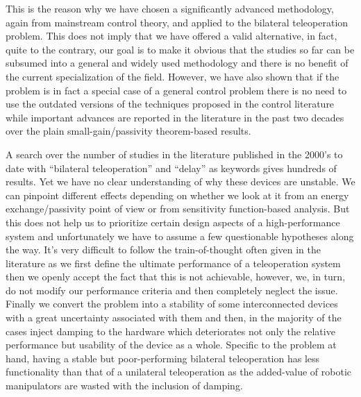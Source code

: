 This is the reason why we have chosen a significantly advanced methodology, again from mainstream control theory, and applied 
to the bilateral teleoperation problem. This does not imply that we have offered a valid alternative, in fact, quite to the contrary, our goal 
is to make it obvious that the studies so far can be subsumed into a general and widely used methodology and there is no benefit of 
the current specialization of the field. However, we have also shown that if the problem is in fact a special case of a general control problem 
there is no need to use the outdated versions of the techniques proposed in the control literature while important advances are reported 
in the literature in the past two decades over the plain small-gain/passivity theorem-based results. 



A search over the number of studies in the literature published in the 2000's to date with \enquote{bilateral teleoperation} and 
\enquote{delay} as keywords gives hundreds of results. Yet we have no clear understanding of why these devices are unstable. We 
can pinpoint different effects depending on whether we look at it from an energy exchange/passivity point of view or from 
sensitivity function-based analysis. But this does not help us to prioritize certain design aspects of a high-performance system
and unfortunately we have to assume a few questionable hypotheses along the way. It's very difficult to follow the train-of-thought
often given in the literature as we first define the ultimate performance of a teleoperation system then we openly accept the fact that
this is not achievable, however, we, in turn, do not modify our performance criteria and then completely neglect the issue. Finally we 
convert the problem into a stability of some interconnected devices with a great uncertainty associated with them and then, in the majority
of the cases inject damping to the hardware which deteriorates not only the relative performance but usability of the device as a whole.
Specific to the problem at hand, having a stable but poor-performing bilateral teleoperation has less functionality than that of a 
unilateral teleoperation as the added-value of robotic manipulators are wasted with the inclusion of damping. 


